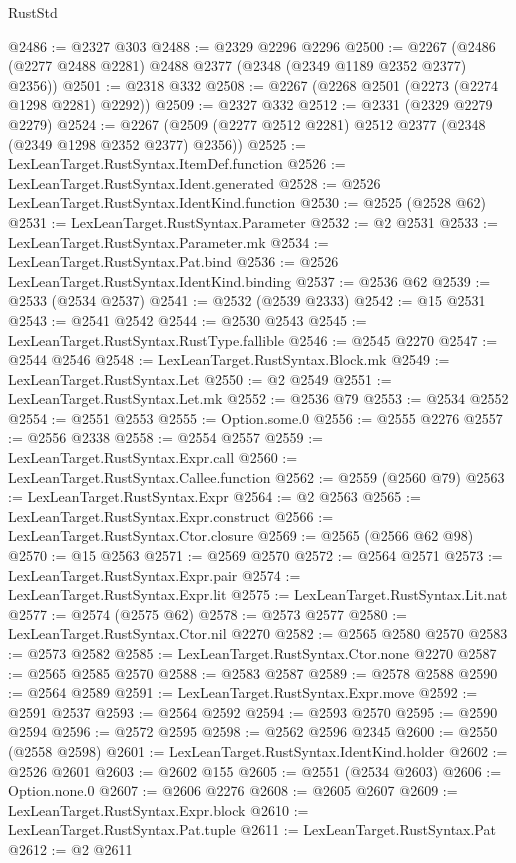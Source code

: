 \begin{lexlean}{RustStd}
\begin{coremodule}
@2486 := @2327 @303
@2488 := @2329 @2296 @2296
@2500 := @2267 (@2486 (@2277 @2488 @2281) @2488 @2377 (@2348 (@2349 @1189 @2352 @2377) @2356))
@2501 := @2318 @332
@2508 := @2267 (@2268 @2501 (@2273 (@2274 @1298 @2281) @2292))
@2509 := @2327 @332
@2512 := @2331 (@2329 @2279 @2279)
@2524 := @2267 (@2509 (@2277 @2512 @2281) @2512 @2377 (@2348 (@2349 @1298 @2352 @2377) @2356))
@2525 := LexLeanTarget.RustSyntax.ItemDef.function
@2526 := LexLeanTarget.RustSyntax.Ident.generated
@2528 := @2526 LexLeanTarget.RustSyntax.IdentKind.function
@2530 := @2525 (@2528 @62)
@2531 := LexLeanTarget.RustSyntax.Parameter
@2532 := @2 @2531
@2533 := LexLeanTarget.RustSyntax.Parameter.mk
@2534 := LexLeanTarget.RustSyntax.Pat.bind
@2536 := @2526 LexLeanTarget.RustSyntax.IdentKind.binding
@2537 := @2536 @62
@2539 := @2533 (@2534 @2537)
@2541 := @2532 (@2539 @2333)
@2542 := @15 @2531
@2543 := @2541 @2542
@2544 := @2530 @2543
@2545 := LexLeanTarget.RustSyntax.RustType.fallible
@2546 := @2545 @2270
@2547 := @2544 @2546
@2548 := LexLeanTarget.RustSyntax.Block.mk
@2549 := LexLeanTarget.RustSyntax.Let
@2550 := @2 @2549
@2551 := LexLeanTarget.RustSyntax.Let.mk
@2552 := @2536 @79
@2553 := @2534 @2552
@2554 := @2551 @2553
@2555 := Option.some.{0}
@2556 := @2555 @2276
@2557 := @2556 @2338
@2558 := @2554 @2557
@2559 := LexLeanTarget.RustSyntax.Expr.call
@2560 := LexLeanTarget.RustSyntax.Callee.function
@2562 := @2559 (@2560 @79)
@2563 := LexLeanTarget.RustSyntax.Expr
@2564 := @2 @2563
@2565 := LexLeanTarget.RustSyntax.Expr.construct
@2566 := LexLeanTarget.RustSyntax.Ctor.closure
@2569 := @2565 (@2566 @62 @98)
@2570 := @15 @2563
@2571 := @2569 @2570
@2572 := @2564 @2571
@2573 := LexLeanTarget.RustSyntax.Expr.pair
@2574 := LexLeanTarget.RustSyntax.Expr.lit
@2575 := LexLeanTarget.RustSyntax.Lit.nat
@2577 := @2574 (@2575 @62)
@2578 := @2573 @2577
@2580 := LexLeanTarget.RustSyntax.Ctor.nil @2270
@2582 := @2565 @2580 @2570
@2583 := @2573 @2582
@2585 := LexLeanTarget.RustSyntax.Ctor.none @2270
@2587 := @2565 @2585 @2570
@2588 := @2583 @2587
@2589 := @2578 @2588
@2590 := @2564 @2589
@2591 := LexLeanTarget.RustSyntax.Expr.move
@2592 := @2591 @2537
@2593 := @2564 @2592
@2594 := @2593 @2570
@2595 := @2590 @2594
@2596 := @2572 @2595
@2598 := @2562 @2596 @2345
@2600 := @2550 (@2558 @2598)
@2601 := LexLeanTarget.RustSyntax.IdentKind.holder
@2602 := @2526 @2601
@2603 := @2602 @155
@2605 := @2551 (@2534 @2603)
@2606 := Option.none.{0}
@2607 := @2606 @2276
@2608 := @2605 @2607
@2609 := LexLeanTarget.RustSyntax.Expr.block
@2610 := LexLeanTarget.RustSyntax.Pat.tuple
@2611 := LexLeanTarget.RustSyntax.Pat
@2612 := @2 @2611

\end{coremodule}
\end{lexlean}
